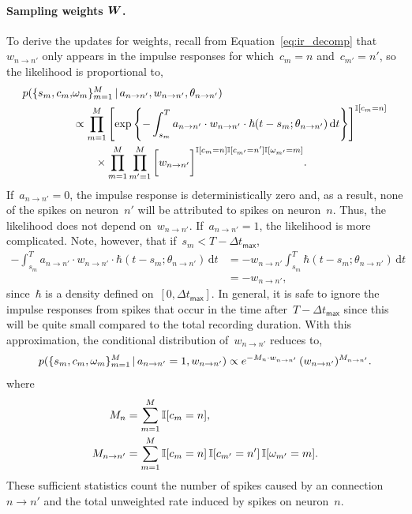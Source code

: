 \paragraph{Sampling weights $\boldsymbol{W}$.} 
To derive the updates for weights, recall from
Equation~\ref{eq:ir_decomp} that~${w_{n \to n'}}$ only
appears in the impulse responses for which~${c_m=n}$
and~${c_{m'}=n'}$, so the likelihood is proportional to,
\begin{align*}
  p(\{s_m, c_m, & \omega_m\}^M_{m=1} \,|\, a_{n \to n'}, w_{n \to n'}, 
  \theta_{n \to n'}) \\
  &\propto \prod_{m=1}^M\left[
    \exp\left\{-\int^T_{s_m} a_{n \to n'} \cdot w_{n \to n'} \cdot \hbar(t - s_m; \theta_{n \to n'}) \, \mathrm{d}t
    \right\} \right]^{\mathbb{I}[c_m=n]} \\
  &\qquad \times \prod_{m=1}^M \prod_{m'=1}^M \bigg[
    w_{n \to n'}\bigg]^{\mathbb{I}[c_{m}=n] \mathbb{I}[c_{m'}=n'] \mathbb{I}[\omega_{m'}=m]}.
\end{align*}
If~${a_{n \to n'}=0}$, the impulse response is deterministically zero
and, as a result, none of the spikes on neuron~$n'$ will be attributed to spikes
on neuron~$n$. Thus, the likelihood does not depend on~$w_{n \to n'}$.
If~${a_{n \to n'}=1}$, the likelihood is more complicated.
Note, however, that if~$s_m < T - \Delta t_{\mathsf{max}}$,
\begin{align*}
  -\int^T_{s_m} a_{n \to n'} \cdot w_{n \to n'} \cdot
  \hbar(t - s_m; \theta_{n \to n'}) \, \mathrm{d}t
  &= -w_{n \to n'}  \int^T_{s_m} \hbar(t - s_m; \theta_{n \to n'}) \, \mathrm{d}t \\
  &= - w_{n \to n'},
\end{align*}
since~$\hbar$ is a density defined on~$[0,\Delta t_{\mathsf{max}}]$.
In general, it is safe to ignore the impulse responses from spikes that 
occur in the time after~$T-\Delta t_{\mathsf{max}}$ since this will be 
quite small compared to the total recording duration. 
With this approximation, the conditional distribution of~$w_{n \to n'}$
reduces to,
\begin{align*}
  p(\{s_m,c_m, \omega_m\}^M_{m=1} \,|\, a_{n \to n'}=1, w_{n \to n'}) 
  \propto 
  e^{-M_n \cdot w_{n \to n'}}  \,
  (w_{n \to n'})^{M_{n \to n'}}.
\end{align*}
where
\begin{align*}
  M_{n} &= \sum_{m=1}^M \mathbb{I}[c_{m}=n], \\
  M_{n \to n'} &= \sum_{m=1}^M \mathbb{I}[c_{m}=n] \, \mathbb{I}[c_{m'}=n'] \, \mathbb{I}[\omega_{m'}=m].
\end{align*}
These sufficient statistics count the number of spikes caused
by an connection~${n \to n'}$ and the total unweighted rate induced by
spikes on neuron~$n$.

